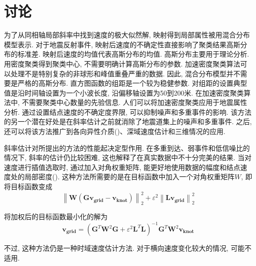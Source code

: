 \section{讨论}
为了从同相轴局部斜率中找到速度的极大似然解, 映射得到局部属性被用混合分布模型表示. 对于地震反射事件, 映射后速度的不确定性直接影响了聚类结果高斯分布的标准差. 映射后速度的均值代表高斯分布的均值. 高斯分布主要用于理论分析. 用密度聚类得到聚类中心, 不需要明确计算高斯分布的参数. 加速密度聚类算法可以处理不是特别复杂的非球形和峰值重叠严重的数据. 因此, 混合分布模型并不需要是严格的高斯分布. 直方图函数的组距是一个较为稳健参数. 对组距的设置典型值是沿时间轴设置为一个小波长度, 沿偏移轴设置为50到200米. 在加速密度聚类算法中, 不需要聚类中心数量的先验信息. 人们可以将加速密度聚类应用于地震属性分析. 通过设置结点速度的不确定度界限, 可以抑制噪声和多重事件的影响. 该方法的另一个潜在好处是在斜率估计之前就消除了地震道集上的噪声和多重事件. 之后, 还可以将该方法推广到各向异性介质(\cite{Alkhalifah2000,Alkhalifah2000a,Casasanta2011})、深域速度估计和三维情况的应用. 

斜率估计对所提出的方法的性能起决定型作用. 在多重到达、弱事件和低信噪比的情况下, 斜率的估计仍比较困难, 这也解释了在真实数据中不十分完美的结果. 当对速度进行插值选取时, 通过加入对角权重矩阵, 能更好地使用数据的幅度和结点速度处的局部密度(\cite{Fomel2003}). 这种方法所需要的是在目标函数中加入一个对角权重矩阵$W$, 即将目标函数变成
\begin{equation}
    \left\|\mathbf{W}\left(\mathbf{G} \mathbf{v}_{\mathbf{g r i d}}-\mathbf{v}_{\mathbf{k n o t}}\right)\right\|_{2}^{2}+\varepsilon^{2}\left\|\mathbf{L} \mathbf{v}_{\mathbf{g r i d}}\right\|_{2}^{2}
\end{equation}

将加权后的目标函数最小化的解为
\begin{equation}
    \mathbf{v}_{\mathbf{g r i d}}=\left(\mathbf{G}^{T} \mathbf{W}^{2} \mathbf{G}+\varepsilon^{2} \mathbf{L}^{T} \mathbf{L}\right)^{-1} \mathbf{G}^{T} \mathbf{W}^{2} \mathbf{v}_{\mathbf{k n o t}}
\end{equation}

不过, 这种方法仍是一种时域速度估计方法. 对于横向速度变化较大的情况, 可能不适用. 

